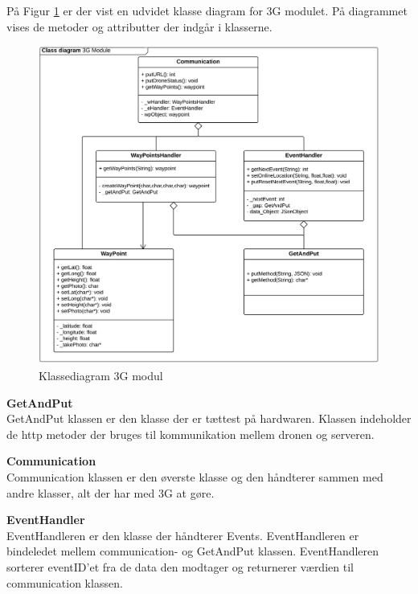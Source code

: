 \newpage
På Figur \ref{fig:classDiagram_3Gmodul} er der vist en udvidet klasse diagram for 3G modulet. På diagrammet vises de metoder og attributter der indgår i klasserne. 

\begin{figure}[H]
	\centering
	\includegraphics[width=1\textwidth]{Billeder/klasse_diagrammer/classdiagram_3gmodule.png}
	\vspace{0cm}
	\caption{Klassediagram 3G modul}
	\label{fig:classDiagram_3Gmodul}
\end{figure}


\textbf{GetAndPut} \\
GetAndPut klassen er den klasse der er tættest på hardwaren. Klassen indeholder de http metoder der bruges til kommunikation mellem dronen og serveren. 

\textbf{Communication} \\
Communication klassen er den øverste klasse og den håndterer sammen med andre klasser, alt der har med 3G at gøre.

\textbf{EventHandler} \\
EventHandleren er den klasse der håndterer Events. EventHandleren er bindeledet mellem communication- og GetAndPut klassen. EventHandleren sorterer eventID'et fra de data den modtager og returnerer værdien til communication klassen.

\newpage

